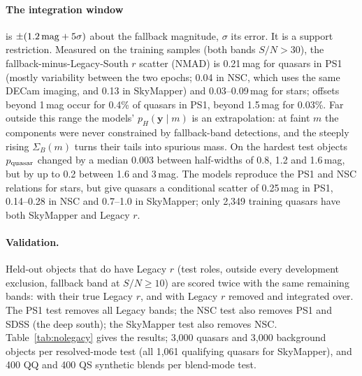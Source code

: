 \documentclass[11pt,a4paper]{article}
\newcommand{\vect}[1]{\boldsymbol{#1}}
\begin{document}
\paragraph{The integration window} is $\pm(1.2\,{\rm mag}+5\sigma)$ about the fallback magnitude, $\sigma$ its
error. It is a support restriction. Measured on the training samples (both bands $S/N>30$), the
fallback-minus-Legacy-South $r$ scatter (NMAD) is 0.21\,mag for quasars in PS1 (mostly variability between the
two epochs; 0.04 in NSC, which uses the same DECam imaging, and 0.13 in SkyMapper) and 0.03--0.09\,mag for
stars; offsets beyond 1\,mag occur for 0.4\% of quasars in PS1, beyond 1.5\,mag for 0.03\%. Far outside this
range the models' $p_H(\vect{y}\mid m)$ is an extrapolation: at faint $m$ the components were never constrained by
fallback-band detections, and the steeply rising $\Sigma_B(m)$ turns their tails into spurious mass. On the
hardest test objects $p_{\rm quasar}$ changed by a median 0.003 between half-widths of 0.8, 1.2 and 1.6\,mag,
but by up to 0.2 between 1.6 and 3\,mag. The models reproduce the PS1 and NSC relations for stars, but give
quasars a conditional scatter of 0.25\,mag in PS1, 0.14--0.28 in NSC and 0.7--1.0 in SkyMapper; only 2,349
training quasars have both SkyMapper and Legacy $r$.

\paragraph{Validation.} Held-out objects that do have Legacy $r$ (test roles, outside every development
exclusion, fallback band at $S/N\geq10$) are scored twice with the same remaining bands: with their true
Legacy $r$, and with Legacy $r$ removed and integrated over. The PS1 test removes all Legacy bands; the NSC test
also removes PS1 and SDSS (the deep south); the SkyMapper test also removes NSC. Table~\ref{tab:nolegacy}
gives the results; 3,000 quasars and 3,000 background objects per resolved-mode test (all 1,061 qualifying
quasars for SkyMapper), and 400 QQ and 400 QS synthetic blends per blend-mode test.

\begin{table}[!htbp]\centering\small
\resizebox{\textwidth}{!}{}
\caption{Scoring without Legacy $r$, against the same objects scored with their true Legacy $r$ and the same
remaining bands (first number magnitude-independent model, second magnitude-dependent). AUC$_{\rm true\,r}$:
with the true Legacy $r$. Recall loss: drop in the fraction of quasars with $p_{\rm quasar}>0.5$. $\Delta$bkg:
change in the fraction of background objects with $p_{\rm quasar}>0.5$. $\Delta r$: posterior-mean minus true
Legacy $r$ of quasars, median (NMAD). Blend mode: AUC loss of $\log{\rm BF}$, median shift of $\log{\rm BF}$, and
the fraction of blends whose $\log{\rm BF}$ has the same sign as with the true Legacy $r$.}
\label{tab:nolegacy}
\end{table}
\end{document}
